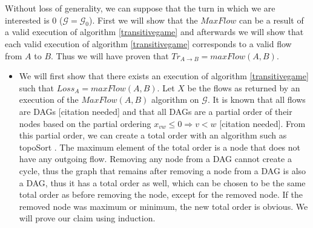        Without loss of generality, we can suppose that the turn in which we are interested is 0 ($\mathcal{G} =
       \mathcal{G}_0$). First we will show that the $MaxFlow$ can be a result of a valid execution of algorithm
       \ref{transitivegame} and afterwards we will show that each valid execution of algorithm \ref{transitivegame}
       corresponds to a valid flow from $A$ to $B$. Thus we will have proven that $Tr_{A \rightarrow B} = maxFlow(A, B)$.
       \begin{itemize}
          \item We will first show that there exists an execution of algorithm \ref{transitivegame} such that $Loss_A =
          maxFlow(A, B)$. Let $X$ be the flows as returned by an execution of the $MaxFlow(A, B)$ algorithm on $\mathcal{G}$.
          It is known that all flows are DAGs [citation needed] and that all DAGs are a partial order of their nodes based on
          the partial ordering $x_{vw} \leq 0 \Rightarrow v < w$ [citation needed]. From this partial order, we can create a
          total order with an algorithm such as topoSort \cite{toposort}. The maximum element of the total order is a node
          that does not have any outgoing flow. Removing any node from a DAG cannot create a cycle, thus the graph that
          remains after removing a node from a DAG is also a DAG, thus it has a total order as well, which can be chosen to
          be the same total order as before removing the node, except for the removed node. If the removed node was maximum
          or minimum, the new total order is obvious. We will prove our claim using induction. \\
\end{itemize}
